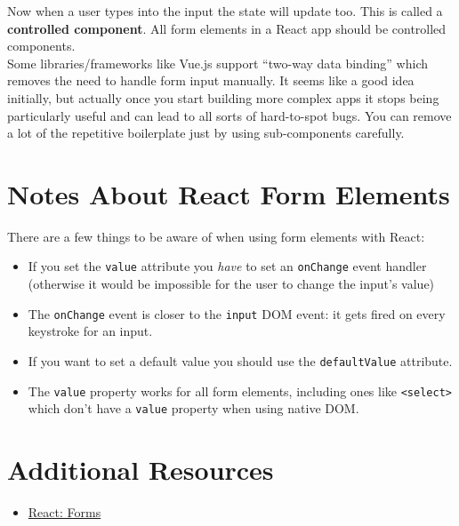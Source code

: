 Now when a user types into the input the state will update too. This is called a \textbf{controlled component}. All form elements in a React app should be controlled components.
\\

Some libraries/frameworks like Vue.js support ``two-way data binding'' which removes the need to handle form input manually. It seems like a good idea initially, but actually once you start building more complex apps it stops being particularly useful and can lead to all sorts of hard-to-spot bugs. You can remove a lot of the repetitive boilerplate just by using sub-components carefully.


\pagebreak


\section{Notes About React Form Elements}

There are a few things to be aware of when using form elements with React:

\begin{itemize}
    \item If you set the \texttt{value} attribute you \textit{have} to set an \texttt{onChange} event handler (otherwise it would be impossible for the user to change the input's value)
    \item The \texttt{onChange} event is closer to the \texttt{input} DOM event: it gets fired on every keystroke for an input.
    \item If you want to set a default value you should use the \texttt{defaultValue} attribute.
    \item The \texttt{value} property works for all form elements, including ones like \texttt{<select>} which don't have a \texttt{value} property when using native DOM.
\end{itemize}


\section{Additional Resources}

\begin{itemize}[leftmargin=*]
    \item \href{https://reactjs.org/docs/forms.html}{React: Forms}
\end{itemize}
